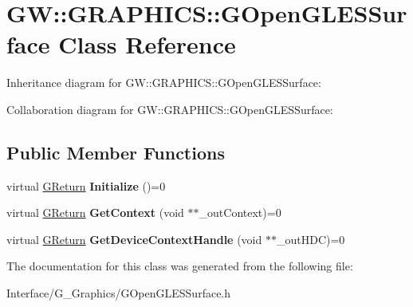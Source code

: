 \hypertarget{classGW_1_1GRAPHICS_1_1GOpenGLESSurface}{}\section{GW\+:\+:G\+R\+A\+P\+H\+I\+CS\+:\+:G\+Open\+G\+L\+E\+S\+Surface Class Reference}
\label{classGW_1_1GRAPHICS_1_1GOpenGLESSurface}


Inheritance diagram for GW\+:\+:G\+R\+A\+P\+H\+I\+CS\+:\+:G\+Open\+G\+L\+E\+S\+Surface\+:


Collaboration diagram for GW\+:\+:G\+R\+A\+P\+H\+I\+CS\+:\+:G\+Open\+G\+L\+E\+S\+Surface\+:
\subsection*{Public Member Functions}
\begin{DoxyCompactItemize}
\item 
\mbox{\label{classGW_1_1GRAPHICS_1_1GOpenGLESSurface_ad084797193d6567c77c7315f79d16da1}} 
virtual \hyperlink{namespaceGW_a67a839e3df7ea8a5c5686613a7a3de21}{G\+Return} {\bfseries Initialize} ()=0
\item 
\mbox{\label{classGW_1_1GRAPHICS_1_1GOpenGLESSurface_a5060c9596a35375a4c5596706fa4babe}} 
virtual \hyperlink{namespaceGW_a67a839e3df7ea8a5c5686613a7a3de21}{G\+Return} {\bfseries Get\+Context} (void $\ast$$\ast$\+\_\+out\+Context)=0
\item 
\mbox{\label{classGW_1_1GRAPHICS_1_1GOpenGLESSurface_a089eee7ad01dd976d91692834bbcda2a}} 
virtual \hyperlink{namespaceGW_a67a839e3df7ea8a5c5686613a7a3de21}{G\+Return} {\bfseries Get\+Device\+Context\+Handle} (void $\ast$$\ast$\+\_\+out\+H\+DC)=0
\end{DoxyCompactItemize}


The documentation for this class was generated from the following file\+:\begin{DoxyCompactItemize}
\item 
Interface/\+G\+\_\+\+Graphics/G\+Open\+G\+L\+E\+S\+Surface.\+h\end{DoxyCompactItemize}

